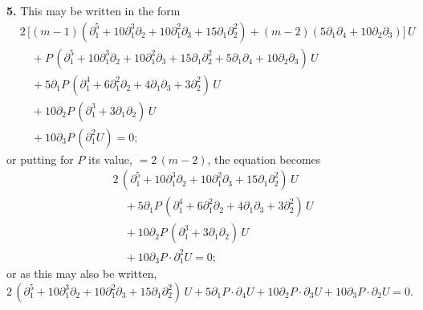 \documentclass[11pt,a4paper]{article}
\begin{document}
\medskip

\textbf{5.} This may be written in the form
\[
\begin{aligned}
&2\,\bigl[(m - 1)(\partial_{1}^{5} + 10\partial_{1}^{3}\partial_{2} + 10\partial_{1}^{2}\partial_{3} + 15\partial_{1}\partial_{2}^{2}) + (m - 2)(5\partial_{1}\partial_{4} + 10\partial_{2}\partial_{3})\bigr]\,U\\
&\quad + P\,(\partial_{1}^{5} + 10\partial_{1}^{3}\partial_{2} + 10\partial_{1}^{2}\partial_{3} + 15\partial_{1}\partial_{2}^{2} + 5\partial_{1}\partial_{4} + 10\partial_{2}\partial_{3})\,U\\
&\quad + 5\partial_{1}P\,(\partial_{1}^{4} + 6\partial_{1}^{2}\partial_{2} + 4\partial_{1}\partial_{3} + 3\partial_{2}^{2})\,U\\
&\quad + 10\partial_{2}P\,(\partial_{1}^{3} + 3\partial_{1}\partial_{2})\,U\\
&\quad + 10\partial_{3}P\,(\partial_{1}^{2}U) = 0;
\end{aligned}
\]
or putting for $P$ its value, $= 2\,(m - 2)$, the equation becomes
\[
\begin{aligned}
&2\,(\partial_{1}^{5} + 10\partial_{1}^{3}\partial_{2} + 10\partial_{1}^{2}\partial_{3} + 15\partial_{1}\partial_{2}^{2})\,U\\
&\quad + 5\partial_{1}P\,(\partial_{1}^{4} + 6\partial_{1}^{2}\partial_{2} + 4\partial_{1}\partial_{3} + 3\partial_{2}^{2})\,U\\
&\quad + 10\partial_{2}P\,(\partial_{1}^{3} + 3\partial_{1}\partial_{2})\,U\\
&\quad + 10\partial_{3}P \cdot \partial_{1}^{2}U = 0;
\end{aligned}
\]
or as this may also be written,
\[
2\,(\partial_{1}^{5} + 10\partial_{1}^{3}\partial_{2} + 10\partial_{1}^{2}\partial_{3} + 15\partial_{1}\partial_{2}^{2})\,U + 5\partial_{1}P \cdot \partial_{4}U + 10\partial_{2}P \cdot \partial_{3}U + 10\partial_{3}P \cdot \partial_{2}U = 0.
\]

\medskip
\end{document}
